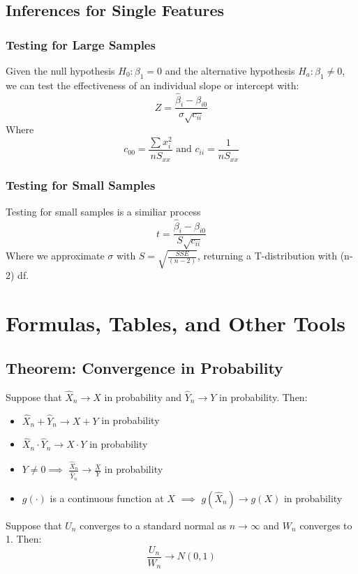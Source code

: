 \documentclass[sn-mathphys,Numbered]{sn-jnl}%
\begin{document}
\subsection{Inferences for Single Features}\label{linear-hypothesis}
\subsubsection{Testing for Large Samples}
Given the null hypothesis $H_0: \beta_1 = 0$ and the alternative hypothesis
$H_a: \beta_1 \neq 0$, we can test the effectiveness of an individual slope or
intercept with:\\
\begin{equation}
    Z = \frac{\hat \beta_i - \beta_{i0}}{\sigma \sqrt{c_{ii}}}
\end{equation}
Where
\begin{equation}
    c_{00} = \frac{\sum x_i^2}{nS_{xx}} \text{ and } c_{ii} = \frac{1}{nS_{xx}}
\end{equation}
\subsubsection{Testing for Small Samples}
Testing for small samples is a similiar process
\begin{equation}
    t = \frac{\hat \beta_i - \beta_{i0}}{S\sqrt{c_{ii}}}
\end{equation}
Where we approximate $\sigma$ with $S = \sqrt{\frac{SSE}{(n-2)}}$, returning a T-distribution with (n-2) df.

\newpage
\section*{Formulas, Tables, and Other Tools}\label{formulas-and-tables}
\subsection*{Theorem: Convergence in Probability}
Suppose that $\hat X_n \to X$ in probability and $\hat Y_n \to Y$ in
probability. Then:
\begin{itemize}
    \item $\hat X_n + \hat Y_n \to X + Y$ in probability
    \item $\hat X_n \cdot \hat Y_n \to X \cdot Y$ in probability
    \item $Y \ne 0 \implies $ $\frac{\hat X_n}{\hat Y_n} \to \frac{X}{Y}$ in probability
    \item $g(\cdot)$ is a continuous function at $X$ $\implies$ $g(\hat X_n) \to g(X)$ in
          probability
\end{itemize}
Suppose that $U_n$ converges to a standard normal as $n \to \infty$ and $W_n$ converges to 1. Then:
\begin{equation}
    \frac{U_n}{W_n} \to N(0, 1)
\end{equation}
\end{document}
